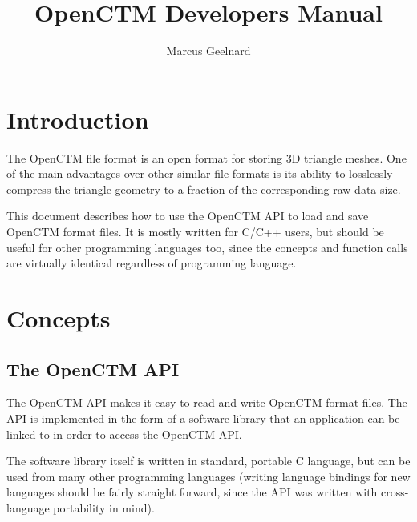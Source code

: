 

\author{Marcus Geelnard}
\title{OpenCTM Developers Manual}




\maketitle

\tableofcontents



\chapter{Introduction}
The OpenCTM file format is an open format for storing 3D triangle meshes.
One of the main advantages over other similar file formats is its ability
to losslessly compress the triangle geometry to a fraction of the corresponding
raw data size.

This document describes how to use the OpenCTM API to load and save OpenCTM
format files. It is mostly written for C/C++ users, but should be useful for
other programming languages too, since the concepts and function calls are
virtually identical regardless of programming language.



\chapter{Concepts}

\section{The OpenCTM API}
The OpenCTM API makes it easy to read and write OpenCTM format files. The API is
implemented in the form of a software library that an application can be linked
to in order to access the OpenCTM API.

The software library itself is written in standard, portable C language, but
can be used from many other programming languages (writing language bindings
for new languages should be fairly straight forward, since the API was written
with cross-language portability in mind).

